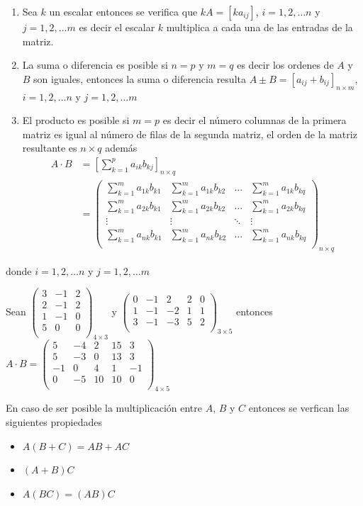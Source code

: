 \documentclass[10pt,]{krantz}
\providecommand{\tightlist}{%
  \setlength{\itemsep}{0pt}\setlength{\parskip}{0pt}}
\theoremstyle{definition}
\theoremstyle{definition}
\theoremstyle{definition}
\theoremstyle{remark}
\let\BeginKnitrBlock\begin \let\EndKnitrBlock\end
\begin{document}
\begin{enumerate}
\def\labelenumi{\arabic{enumi}.}
\item
  Sea \(k\) un escalar entonces se verifica que \(kA=[ka_{ij}]\), \(i=1,2,\ldots n\) y \(j=1,2,\ldots m\) es decir el escalar \(k\) multiplica a cada una de las entradas de la matriz.
\item
  La suma o diferencia es posible si \(n=p\) y \(m=q\) es decir los ordenes de \(A\) y \(B\) son iguales, entonces la suma o diferencia resulta \(A\pm B=[a_{ij}+b_{ij}]_{n\times m}\), \(i=1,2,\ldots n\) y \(j=1,2,\ldots m\)
\item
  El producto es posible si \(m=p\) es decir el número columnas de la primera matriz es igual al número de filas de la segunda matriz, el orden de la matriz resultante es \(n\times q\) además
  \begin{align*}
  A\cdot B&=\left[\sum_{k=1}^pa_{ik}b_{kj}\right]_{n\times q}\\
  &=\begin{pmatrix}
  \sum_{k=1}^ma_{1k}b_{k1}&\sum_{k=1}^ma_{1k}b_{k2}&\ldots&\sum_{k=1}^ma_{1k}b_{kq}\\
  \sum_{k=1}^ma_{2k}b_{k1}&\sum_{k=1}^ma_{2k}b_{k2}&\ldots&\sum_{k=1}^ma_{2k}b_{kq}\\
  \vdots & \vdots & \ddots &\vdots \\
  \sum_{k=1}^ma_{nk}b_{k1}&\sum_{k=1}^ma_{nk}b_{k2}&\ldots&\sum_{k=1}^ma_{nk}b_{kq}\\
  \end{pmatrix}_{n\times q}
  \end{align*}
\end{enumerate}

donde \(i=1,2,\ldots n\) y \(j=1,2,\ldots m\)

\BeginKnitrBlock{example}
\protect\hypertarget{exm:unnamed-chunk-15}{}{\label{exm:unnamed-chunk-15} }Sean \(\begin{pmatrix} 3&-1&2\\ 2&-1&2\\ 1&-1&0\\ 5&0&0\\ \end{pmatrix}_{4\times 3}\) y \(\begin{pmatrix} 0&-1&2&2&0\\ 1&-1&-2&1&1\\ 3&-1&-3&5&2\\ \end{pmatrix}_{3\times 5}\) entonces \(A\cdot B=\begin{pmatrix} 5&-4&2&15&3\\ 5&-3&0&13&3\\ -1&0&4&1&-1\\ 0&-5&10&10&0\\ \end{pmatrix}_{4\times 5}\)
\EndKnitrBlock{example}

En caso de ser posible la multiplicación entre \(A\), \(B\) y \(C\) entonces se verfican las siguientes propiedades

\begin{itemize}
\tightlist
\item
  \(A(B+C)=AB+AC\)
\item
  \((A+B)C\)
\item
  \(A(BC)=(AB)C\)
\end{itemize}



\printindex
\end{document}
